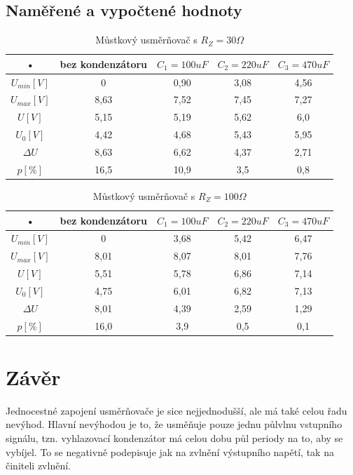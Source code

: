 \documentclass[12pt]{article} %
\begin{document}
\subsection{Naměřené a vypočtené hodnoty}
\begin{table}[H]
\caption{Můstkový usměrňovač s $R_Z=30\Omega$}
\begin{tabular}{|c|c|c|c|c|}
\hline 
• & bez kondenzátoru & $C_1 = 100uF$ & $C_2 = 220uF$ & $C_3 = 470uF$ \\ 
\hline 
$U_{min} [V]$ & 0 & 0,90 & 3,08 & 4,56 \\ 
\hline 
$U_{max} [V]$ & 8,63 & 7,52 & 7,45 & 7,27 \\ 
\hline 
$U [V]$ & 5,15 & 5,19 & 5,62 & 6,0 \\ 
\hline 
$U_0 [V]$ & 4,42 & 4,68 & 5,43 & 5,95 \\ 
\hline 
$\Delta U$ & 8,63 & 6,62 & 4,37 & 2,71 \\ 
\hline 
$p [\%]$ & 16,5 & 10,9 & 3,5 & 0,8 \\ 
\hline 
\end{tabular}
\end{table}

\begin{table}[H]
\caption{Můstkový usměrňovač s $R_Z=100\Omega$}
\begin{tabular}{|c|c|c|c|c|}
\hline 
• & bez kondenzátoru & $C_1 = 100uF$ & $C_2 = 220uF$ & $C_3 = 470uF$ \\ 
\hline 
$U_{min} [V]$ & 0 & 3,68 & 5,42 & 6,47 \\ 
\hline 
$U_{max} [V]$ & 8,01 & 8,07 & 8,01 & 7,76 \\ 
\hline 
$U [V]$ & 5,51 & 5,78 & 6,86 & 7,14 \\ 
\hline 
$U_0 [V]$ & 4,75 & 6,01 & 6,82 & 7,13 \\ 
\hline 
$\Delta U$ & 8,01 & 4,39 & 2,59 & 1,29 \\ 
\hline 
$p [\%]$ & 16,0 & 3,9 & 0,5 & 0,1 \\ 
\hline 
\end{tabular}
\end{table}

\section{Závěr}
Jednocestné zapojení usměrňovače je sice nejjednodušší, ale má také celou řadu nevýhod. Hlavní nevýhodou je to, že usměňuje pouze jednu půlvlnu vstupního signálu, tzn. vyhlazovací kondenzátor má celou dobu půl periody na to, aby se vybíjel. To se negativně podepisuje jak na zvlnění výstupního napětí, tak  na činiteli zvlnění.
\end{document}

